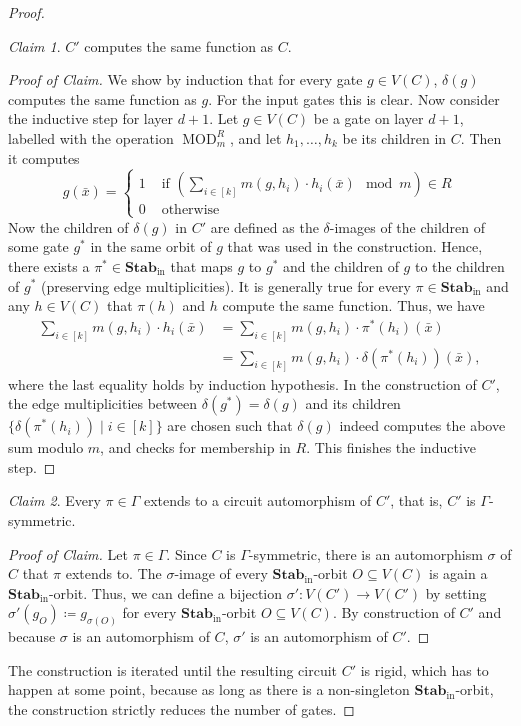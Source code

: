 \documentclass[11pt]{article}
\DeclareMathOperator{\MOD}{MOD}
\newcommand{\Stab}{\mathbf{Stab}}
\theoremstyle{definition}
\theoremstyle{plain}
\theoremstyle{remark}
\newtheorem{claim}{Claim}[lemma]
\newenvironment{claimproof}[1][Proof of Claim]{\begin{proof}[#1] \renewcommand{\qedsymbol}{$\lrcorner$}}{ \end{proof}}
\theoremstyle{remark}
\begin{document}
\begin{proof}
	\begin{claim}
		$C'$ computes the same function as $C$.
	\end{claim}
	\begin{claimproof}
		We show by induction that for every gate $g \in V(C)$, $\delta(g)$ computes the same function as $g$. For the input gates this is clear. Now consider the inductive step for layer $d+1$. Let $g \in V(C)$ be a gate on layer $d+1$, labelled with the operation $\MOD_m^R$, and let $h_1, \dots, h_k$ be its children in $C$. Then it computes 
		\[
		g(\bar{x}) = \begin{cases}
			1 & \text{ if } (\sum_{i \in [k]} m(g,h_i) \cdot h_i(\bar{x}) \mod m) \in R\\
			0 & \text{ otherwise}
		\end{cases}
		\]
		Now the children of $\delta(g)$ in $C'$ are defined as the $\delta$-images of the children of some gate $g^*$ in the same orbit of $g$ that was used in the construction. Hence, there exists a $\pi^* \in \Stab_{\text{in}}$ that maps $g$ to $g^*$ and the children of $g$ to the children of $g^*$ (preserving edge multiplicities). It is generally true for every $\pi \in \Stab_{\text{in}}$ and any $h \in V(C)$ that $\pi(h)$ and $h$ compute the same function. Thus, we have
		\begin{align*}
			\sum_{i \in [k]} m(g,h_i) \cdot h_i(\bar{x}) &= \sum_{i \in [k]} m(g,h_i) \cdot \pi^*(h_i)(\bar{x}) \\
			&= \sum_{i \in [k]} m(g,h_i) \cdot \delta(\pi^*(h_i))(\bar{x}),
		\end{align*}
		where the last equality holds by induction hypothesis. In the construction of $C'$, the edge multiplicities between $\delta(g^*) = \delta(g)$ and its children $\{\delta(\pi^*(h_i)) \mid i \in [k]\}$ are chosen such that $\delta(g)$ indeed computes the above sum modulo $m$, and checks for membership in $R$. This finishes the inductive step.
	\end{claimproof}
	
	
	\begin{claim}
		Every $\pi \in \Gamma$ extends to a circuit automorphism of $C'$, that is, $C'$ is $\Gamma$-symmetric.
	\end{claim}
	\begin{claimproof}
		Let $\pi \in \Gamma$. Since $C$ is $\Gamma$-symmetric, there is an automorphism $\sigma$ of $C$ that $\pi$ extends to. The $\sigma$-image of every $\Stab_{\text{in}}$-orbit $O \subseteq V(C)$ is again a $\Stab_{\text{in}}$-orbit. Thus, we can define a bijection $\sigma' \colon V(C') \to V(C')$ by setting $\sigma'(g_O) \coloneqq g_{\sigma(O)}$ for every $\Stab_{\text{in}}$-orbit $O \subseteq V(C)$. By construction of $C'$ and because $\sigma$ is an automorphism of $C$, $\sigma'$ is an automorphism of $C'$. 
	\end{claimproof}
	The construction is iterated until the resulting circuit $C'$ is rigid, which has to happen at some point, because as long as there is a non-singleton $\Stab_{\text{in}}$-orbit, the construction strictly reduces the number of gates.
\end{proof}	
\end{document}
